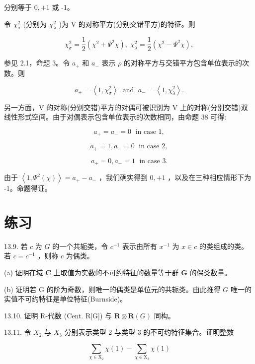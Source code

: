 \documentclass[10pt]{article}
\begin{document}
分别等于 \(0, + 1\) 或 -1。

令 \({\chi }_{\sigma }^{2}\) (分别为 \({\chi }_{\lambda }^{2}\) )为 V 的对称平方(分别交错平方)的特征。则

\[
{\chi }_{\sigma }^{2} = \frac{1}{2}\left( {{\chi }^{2} + {\Psi }^{2}\chi }\right) ,\;{\chi }_{\lambda }^{2} = \frac{1}{2}\left( {{\chi }^{2} - {\Psi }^{2}\chi }\right) ,
\]

参见 2.1，命题 3。令 \({a}_{ + }\) 和 \({a}_{ - }\) 表示 \(\rho\) 的对称平方与交错平方包含单位表示的次数。则

\[
{a}_{ + } = \left\langle  {1,{\chi }_{\sigma }^{2}}\right\rangle  \;\text{ and }\;{a}_{ - } = \left\langle  {1,{\chi }_{\lambda }^{2}}\right\rangle  .
\]

另一方面，V 的对称(分别交错)平方的对偶可被识别为 V 上的对称(分别交错)双线性形式空间。由于对偶表示包含单位表示的次数相同，由命题 38 可得:

\[
{a}_{ + } = {a}_{ - } = 0\;\text{ in case }1,
\]

\[
{a}_{ + } = 1,{a}_{ - } = 0\;\text{ in case }2,
\]

\[
{a}_{ + } = 0,{a}_{ - } = 1\;\text{ in case }3.
\]

由于 \(\left\langle  {1,{\Psi }^{2}\left( \chi \right) }\right\rangle   = {a}_{ + } - {a}_{ - }\) ，我们确实得到 \(0, + 1\) ，以及在三种相应情形下为 -1。命题得证。

\section*{练习}

13.9. 若 \(c\) 为 \(G\) 的一个共轭类，令 \({c}^{-1}\) 表示由所有 \({x}^{-1}\) 为 \(x \in  c\) 的类组成的类。若 \(c = {c}^{-1}\) ，则称 \(c\) 为偶类。

(a) 证明在域 \(\mathbf{C}\) 上取值为实数的不可约特征的数量等于群 \(\mathbf{G}\) 的偶类数量。

(b) 证明若 G 的阶为奇数，则唯一的偶类是单位元的共轭类。由此推得 \(G\) 唯一的实值不可约特征是单位特征(Burnside)。

13.10. 证明 R-代数 (Cent. R[G]) 与 \(\mathbf{R} \otimes  \mathbf{R}\left( G\right)\) 同构。

13.11. 令 \({X}_{2}\) 与 \({X}_{3}\) 分别表示类型 2 与类型 3 的不可约特征集合。证明整数

\[
\mathop{\sum }\limits_{{\chi  \in  {\mathrm{X}}_{2}}}\chi \left( 1\right)  - \mathop{\sum }\limits_{{\chi  \in  {\mathrm{X}}_{3}}}\chi \left( 1\right)
\]
\end{document}
